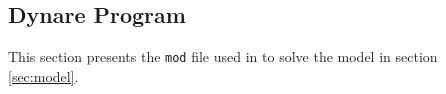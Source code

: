 \documentclass[
thesis.tex
]{subfiles}
\begin{document}




\newpage

\subsection{Dynare Program}

This section presents the \texttt{mod} file used in \dynare to solve the model in section \ref{sec:model}.

\vspace*{-0.5cm}
\end{document}
